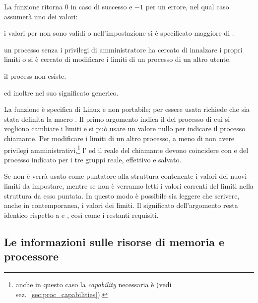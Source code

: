 \begin{funcproto}{
}

{La funzione ritorna $0$ in caso di successo e $-1$ per un errore, nel qual
  caso  assumerà uno dei valori:
  \begin{errlist}
  \item[\errcode{EINVAL}] i valori per  non sono validi o
    nell'impostazione si è specificato  maggiore di
    .
  \item[\errcode{EPERM}] un processo senza i privilegi di amministratore ha
    cercato di innalzare i propri limiti o si è cercato di modificare i limiti
    di un processo di un altro utente.
  \item [\errcode{ESRCH}] il process  non esiste.
  \end{errlist}
  ed inoltre  nel suo significato generico.
}
\end{funcproto}

La funzione è specifica di Linux e non portabile; per essere usata richiede
che sia stata definita la macro . Il primo argomento
indica il  del processo di cui si vogliono cambiare i limiti e si può
usare un valore nullo per indicare il processo chiamante.  Per modificare i
limiti di un altro processo, a meno di non avere privilegi
amministrativi,\footnote{anche in questo caso la \textit{capability}
  necessaria è  (vedi
  sez.~\ref{sec:proc_capabilities}).}  l' ed il  reale del
chiamante devono coincidere con  e  del processo indicato
per i tre gruppi reale, effettivo e salvato.

Se  non è  verrà usato come puntatore alla
struttura  contenente i valori dei nuovi limiti da impostare,
mentre se  non è  verranno letti i valori correnti
del limiti nella struttura  da esso puntata. In questo modo è
possibile sia leggere che scrivere, anche in contemporanea, i valori dei
limiti. Il significato dell'argomento  resta identico rispetto
a  e , così come i restanti requisiti. 


\subsection{Le informazioni sulle risorse di memoria e processore}
\label{sec:sys_memory_res}

